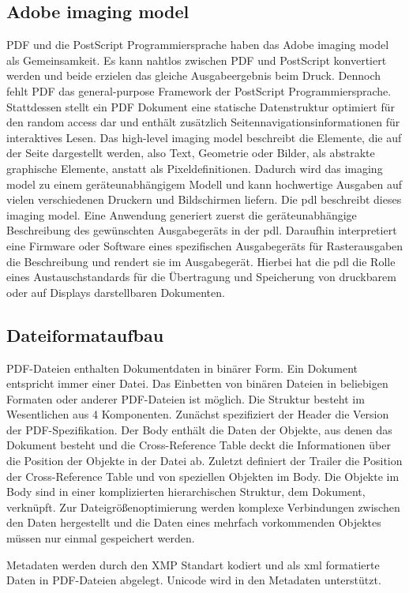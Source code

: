 \subsection{Adobe imaging model}
PDF und die PostScript Programmiersprache haben das Adobe imaging model als Gemeinsamkeit. Es kann nahtlos zwischen PDF und PostScript konvertiert werden und beide erzielen das gleiche Ausgabeergebnis beim Druck. Dennoch fehlt PDF das general-purpose Framework der PostScript Programmiersprache. Stattdessen stellt ein PDF Dokument eine statische Datenstruktur optimiert für den random access dar und enthält zusätzlich Seitennavigationsinformationen für interaktives Lesen. Das high-level imaging model beschreibt die Elemente, die auf der Seite dargestellt werden, also Text, Geometrie oder Bilder, als abstrakte graphische Elemente, anstatt als Pixeldefinitionen. Dadurch wird das imaging model zu einem geräteunabhängigem Modell und kann hochwertige Ausgaben auf vielen verschiedenen Druckern und Bildschirmen liefern. Die \gls{pdl} beschreibt dieses imaging model. Eine Anwendung generiert zuerst die geräteunabhängige Beschreibung des gewünschten Ausgabegeräts in der \gls{pdl}. Daraufhin interpretiert eine Firmware oder Software eines spezifischen Ausgabegeräts für Rasterausgaben die Beschreibung und rendert sie im Ausgabegerät. Hierbei hat die \gls{pdl} die Rolle eines Austauschstandards für die Übertragung und Speicherung von druckbarem oder auf Displays darstellbaren Dokumenten. \cite{adobe-postscript}

\subsection{Dateiformataufbau}
PDF-Dateien enthalten Dokumentdaten in binärer Form. Ein Dokument entspricht immer einer Datei. Das Einbetten von binären Dateien in beliebigen Formaten oder anderer PDF-Dateien ist möglich. Die Struktur besteht im Wesentlichen aus 4 Komponenten. Zunächst spezifiziert der Header die Version der PDF-Spezifikation. Der Body enthält die Daten der Objekte, aus denen das Dokument besteht und die Cross-Reference Table deckt die Informationen über die Position der Objekte in der Datei ab. Zuletzt definiert der Trailer die Position der Cross-Reference Table und von speziellen Objekten im Body. Die Objekte im Body sind in einer komplizierten hierarchischen Struktur, dem Dokument, verknüpft. Zur Dateigrößenoptimierung werden komplexe Verbindungen zwischen den Daten hergestellt und die Daten eines mehrfach vorkommenden Objektes müssen nur einmal gespeichert werden. \cite{softx}
\par
Metadaten werden durch den XMP Standart kodiert und als \gls{xml} formatierte Daten in PDF-Dateien abgelegt. Unicode wird in den Metadaten unterstützt. \cite{softx}
